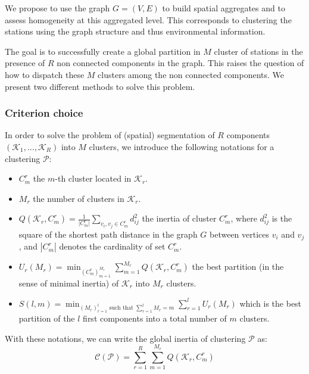 We propose to use the graph $G=(V,E)$ to build spatial aggregates and to assess homogeneity at this aggregated level. This corresponds to clustering the stations using the graph structure and thus environmental information.

The goal is to successfully create a global partition in $M$ cluster of stations in the presence of $R$ non connected components in the graph. This raises the question of how to dispatch these $M$ clusters among the non connected components. We present two different methods to solve this problem.


\subsubsection{Criterion choice}

In order to solve the problem of (spatial) segmentation of $R$ components $(\mathcal{K}_1,\dots,\mathcal{K}_R)$ into $M$ clusters, we introduce the following notations for a clustering $\mathcal{P}$: 
\begin{itemize}
    \item $C_m^r$ the $m$-th cluster located in $\mathcal{K}_r$.
    \item $M_r$ the number of clusters in $\mathcal{K}_r$.
    \item $\displaystyle Q(\mathcal{K}_r,C_m^r) = \frac{1}{\lvert C_m^r\rvert}\sum_{v_i,v_j \in C_m^r}d_{ij}^2$ the inertia of cluster $C^r_m$, where $d^2_{ij}$ is the square of the shortest path distance in the graph $G$ between vertices $v_i$ and $v_j$, and $|C_m^r|$ denotes the cardinality of set $C_m^r$.
    \item $\displaystyle U_r(M_r) = \min_{(C_m^r)_{m=1}^{M_r}}\sum_{m = 1}^{M_r}Q(\mathcal{K}_r,C_m^r)$ the best partition (in the sense of minimal inertia) of $\mathcal{K}_r$ into $M_r$ clusters. 
    \item $\displaystyle S(l,m) = \min_{(M_r)_{r=1}^l \text{ such that } \sum_{r=1}^l M_r = m}\sum_{r=1}^lU_r(M_r)$ which is the best partition of the $l$ first components into a total number of $m$ clusters.
\end{itemize} 

With these notations, we can write the global inertia of clustering $\mathcal{P}$ as: 
\begin{equation}\label{global:inertia}
\mathcal{C}(\mathcal{P}) = \sum_{r=1}^R\sum_{m=1}^{M_r}Q(\mathcal{K}_r,C^r_m)
\end{equation}

